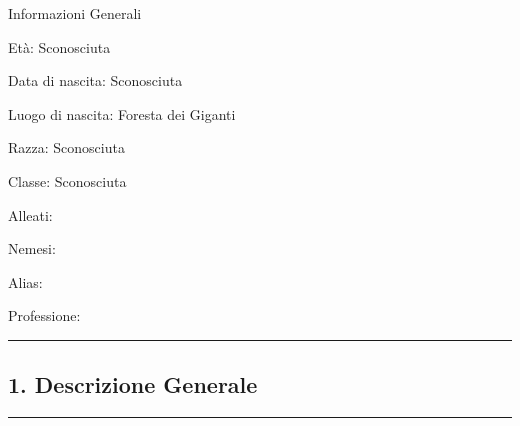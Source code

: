 Informazioni Generali

Età: Sconosciuta

Data di nascita: Sconosciuta

Luogo di nascita: Foresta dei Giganti

Razza: Sconosciuta

Classe: Sconosciuta

Alleati:

Nemesi:

Alias:

Professione:

\begin{center}\rule{0.5\linewidth}{0.5pt}\end{center}

\subsection{1. Descrizione Generale}\label{descrizione-generale}

\begin{center}\rule{0.5\linewidth}{0.5pt}\end{center}


